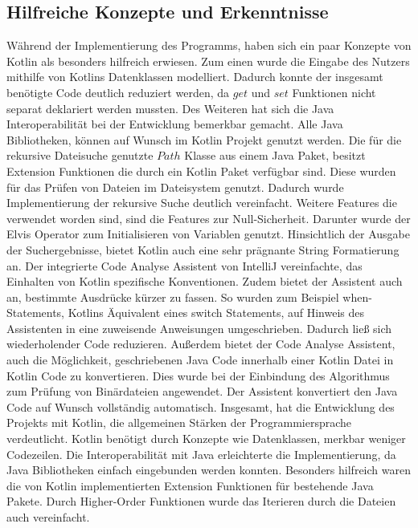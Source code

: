 \documentclass{article}
\begin{document}
\subsection{Hilfreiche Konzepte und Erkenntnisse}
Während der Implementierung des Programms, haben sich ein paar Konzepte von Kotlin als besonders hilfreich erwiesen. Zum einen wurde die Eingabe des Nutzers mithilfe von Kotlins Datenklassen modelliert. Dadurch konnte der insgesamt benötigte Code deutlich reduziert werden, da $get$ und $set$ Funktionen nicht separat deklariert werden mussten. Des Weiteren hat sich die Java Interoperabilität bei der Entwicklung bemerkbar gemacht. Alle Java Bibliotheken, können auf Wunsch im Kotlin Projekt genutzt werden. Die für die rekursive Dateisuche genutzte $Path$ Klasse aus einem Java Paket, besitzt Extension Funktionen die durch ein Kotlin Paket verfügbar sind. Diese wurden für das Prüfen von Dateien im Dateisystem genutzt. Dadurch wurde Implementierung der rekursive Suche deutlich vereinfacht. Weitere Features die verwendet worden sind, sind die Features zur Null-Sicherheit. Darunter wurde der Elvis Operator zum Initialisieren von Variablen genutzt. Hinsichtlich der Ausgabe der Suchergebnisse, bietet Kotlin auch eine sehr prägnante String Formatierung an. \newline
Der integrierte Code Analyse Assistent von IntelliJ vereinfachte, das Einhalten von Kotlin spezifische Konventionen. Zudem bietet der Assistent auch an, bestimmte Ausdrücke kürzer zu fassen. So wurden zum Beispiel when-Statements, Kotlins Äquivalent eines switch Statements, auf Hinweis des Assistenten in eine zuweisende Anweisungen umgeschrieben. Dadurch ließ sich wiederholender Code reduzieren. Außerdem bietet der Code Analyse Assistent, auch die Möglichkeit, geschriebenen Java Code innerhalb einer Kotlin Datei in Kotlin Code zu konvertieren. Dies wurde bei der Einbindung des Algorithmus zum Prüfung von Binärdateien angewendet. Der Assistent konvertiert den Java Code auf Wunsch vollständig automatisch.\newline
Insgesamt, hat die Entwicklung des Projekts mit Kotlin, die allgemeinen Stärken der Programmiersprache verdeutlicht. Kotlin benötigt durch Konzepte wie Datenklassen, merkbar weniger Codezeilen. Die Interoperabilität mit Java erleichterte die Implementierung, da Java Bibliotheken einfach eingebunden werden konnten. Besonders hilfreich waren die von Kotlin implementierten Extension Funktionen für bestehende Java Pakete. Durch Higher-Order Funktionen wurde das Iterieren durch die Dateien auch vereinfacht.
\end{document}
